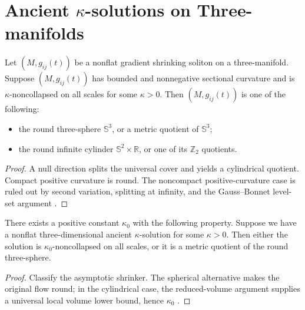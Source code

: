 \section{Ancient \texorpdfstring{$\kappa$}{kappa}-solutions on Three-manifolds}
\begin{lemma}
  \label{lem:cz-three-dimensional-shrinking-soliton-classification}
 Let $(M,g_{ij}(t))$ be a nonflat gradient shrinking
soliton on a three-manifold. Suppose $(M,g_{ij}(t))$ has bounded
and nonnegative sectional curvature and is $\kappa$-noncollapsed
on all scales for some $\kappa>0$. Then $(M,g_{ij}(t))$ is one of
the following:
\begin{itemize}
\item[(i)] the round three-sphere $\mathbb{S}^3$, or a metric
quotient of $\mathbb{S}^3$; \item[(ii)] the round infinite
cylinder $\mathbb{S}^2\times \mathbb{R}$, or one of its
$\mathbb{Z}_2$ quotients.
\end{itemize}
\end{lemma}
\begin{proof}
\sketch A null direction splits the universal cover and yields a
cylindrical quotient.  Compact positive curvature is round.  The
noncompact positive-curvature case is ruled out by second variation,
splitting at infinity, and the Gauss--Bonnet level-set argument
\cite{P2}.
\end{proof}
\begin{proposition}
  \label{prop:cz-ancient-three-dimensional-universal-noncollapsing}
 There exists a positive constant $\kappa_0$ with
the following property. Suppose we have a nonflat
three-dimensional ancient $\kappa$-solution for some $\kappa >0$.
Then either the solution is $\kappa_0$-noncollapsed on all scales,
or it is a metric quotient of the round three-sphere.
\end{proposition}
\begin{proof}
\sketch Classify the asymptotic shrinker.  The spherical alternative
makes the original flow round; in the cylindrical case, the
reduced-volume argument supplies a universal local volume lower bound,
hence $\kappa_0$ \cite{P2}.
\end{proof}
